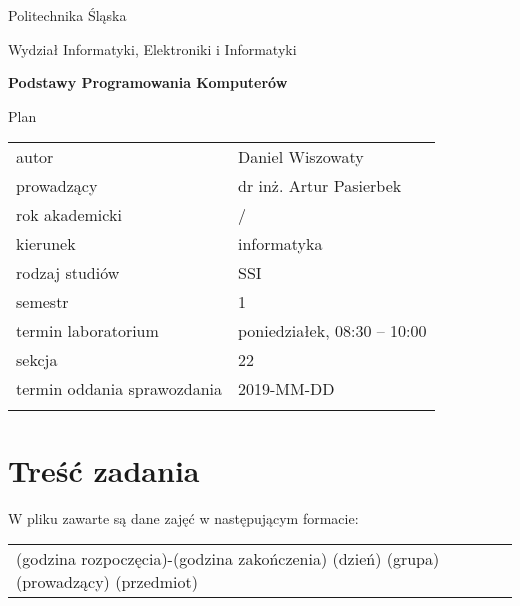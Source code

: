 \documentclass[12pt,a4paper,oneside]{article}
\let\oldmarginpar\marginpar
\renewcommand\marginpar[1]{%
  {\linespread{0.85}\normalfont\scriptsize%
\oldmarginpar[\hspace{1cm}\begin{minipage}{3cm}\raggedleft\scriptsize\color{black}\textsf{#1}\end{minipage}]%
{\hspace{0cm}\begin{minipage}{3cm}\raggedright\scriptsize\color{black}\textsf{#1}\end{minipage}}%
}%
}
\newcounter{rok}
\newcommand{\rokakademicki}{%
   \setcounter{rok}{\number\year}%
   \ifthenelse{\number\month<10}%
   {\addtocounter{rok}{-1}}%
   {}%
   \arabic{rok}/\addtocounter{rok}{1}\arabic{rok}
}
\begin{document}
\frenchspacing
\thispagestyle{empty}
\begin{center}
{\Large\sf Politechnika Śląska   %

Wydział Informatyki, Elektroniki i Informatyki

}

\vfill

 

\vfill\vfill

{\Huge\sffamily\bfseries Podstawy Programowania Komputerów\par}  

\vfill\vfill

{\LARGE\sf Plan}   


\vfill \vfill\vfill\vfill






\begin{tabular}{ll}
	\toprule
	autor                       & Daniel Wiszowaty    \\
	prowadzący                  & dr inż. Artur Pasierbek  \\
	rok akademicki              & \rokakademicki         \\
	kierunek                    & informatyka            \\
	rodzaj studiów              & SSI                    \\
	semestr                     & 1                      \\
	termin laboratorium         & poniedziałek, 08:30 -- 10:00 \\
	sekcja                      & 22                     \\
	termin oddania sprawozdania & 2019-MM-DD             \\
	\bottomrule
	                            &
\end{tabular}

\end{center}

\cleardoublepage

\section{Treść zadania}
\marginpar{}
W pliku zawarte są dane zajęć w następującym formacie: \newline \newline
\begin{tabular}{ll}
\footnotesize
\centering (godzina rozpoczęcia)-(godzina zakończenia) (dzień) (grupa) (prowadzący) (przedmiot)
\end{tabular} \newline
\end{document}
